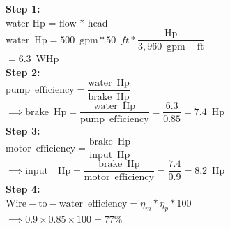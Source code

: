 \documentclass{article}
\begin{document}
\begin{enumerate}
\begin{figure}[h!]

\end{figure}
\textbf{Step 1:}\\
water Hp = flow * head\\
$\mathrm{water} \enspace \mathrm{Hp} = 500 \enspace \mathrm{gpm}*50 \enspace ft*\dfrac{\mathrm{Hp}}{3,960 \enspace \mathrm{gpm-ft}}$\\
$=\boxed{ 6.3 \enspace \mathrm{WHp}}$\\ 
\vspace{0.1cm}
  \textbf{Step 2:}\\
$\mathrm{pump \enspace efficiency} =\dfrac{\mathrm{water \enspace Hp}}{\mathrm{brake \enspace Hp}}$\\
$ \implies \mathrm{brake \enspace Hp}=\dfrac{\mathrm{water \enspace Hp}}{\mathrm{pump \enspace efficiency}} = \dfrac{6.3}{0.85}=\boxed{7.4 \enspace \mathrm{Hp}}$\\
\vspace{0.1cm}
  \textbf{Step 3:}\\
$\mathrm{motor \enspace efficiency} =\dfrac{\mathrm{brake \enspace Hp}}{\mathrm{input \enspace Hp}}$\\
$ \implies \mathrm{input \enspace \enspace Hp}=\dfrac{\mathrm{brake \enspace Hp}}{\mathrm{motor \enspace efficiency}}= \dfrac{7.4}{0.9}=\boxed{8.2 \enspace \mathrm{Hp}}$\\
\vspace{0.1cm}
  \textbf{Step 4:}\\

$\mathrm{Wire-to-water} \enspace \mathrm{efficiency}=\eta_m * \eta_p * 100$\\
$\implies 0.9 \times 0.85 \times 100=\boxed{77 \%}$

\newpage


\end{enumerate}
\end{document}
